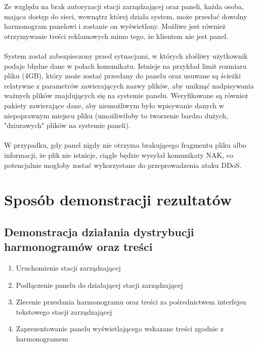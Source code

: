 \documentclass[12pt, a4paper]{article}
\providecommand{\tightlist}{%
  \setlength{\itemsep}{0pt}\setlength{\parskip}{0pt}}
\begin{document}
Ze względu na brak autoryzacji stacji zarządzającej oraz paneli, każda osoba, mająca dostęp do sieci, wewnątrz której działa system, może przesłać dowolny harmonogram panelowi i zostanie on wyświetlony. Możliwe jest również otrzymywanie treści reklamowych mimo tego, że klientem nie jest panel.
\\
\\
System został zabezpieczony przed sytuacjami, w których złośliwy użytkownik podaje błędne dane w polach komunikatu. Istnieje na przykład limit rozmiaru pliku (4GB), który może zostać przesłany do panelu oraz usuwane są ścieżki relatywne z parametrów zawierających nazwy plików, aby uniknąć nadpisywania ważnych plików znajdujących się na systemie panelu. Weryfikowane są również pakiety zawierające dane, aby niemożliwym było wpisywanie danych w niepoprawnym miejscu pliku (umożliwiłoby to tworzenie bardzo dużych, "dziurawych" plików na systemie paneli).
\\
\\
W przypadku, gdy panel nigdy nie otrzyma brakującego fragmentu pliku albo informacji, że plik nie istnieje, ciągle będzie wysyłał komunikaty NAK, co potencjalnie mogłoby zostać wykorzystane do przeprowadzenia ataku DDoS.

\hypertarget{sposuxf3b-demonstracji-rezultatuxf3w}{%
\section{Sposób demonstracji rezultatów}\label{sposuxf3b-demonstracji-rezultatuxf3w}}

\hypertarget{demonstracja-dziaux142ania-dystrybucji-harmonogramuxf3w-oraz-treux15bci}{%
\subsection{Demonstracja działania dystrybucji harmonogramów oraz treści}\label{demonstracja-dziaux142ania-dystrybucji-harmonogramuxf3w-oraz-treux15bci}}

\begin{enumerate}
\def\labelenumi{\arabic{enumi}.}
\tightlist
\item
  Uruchomienie stacji zarządzającej
\item
  Podłączenie panelu do działającej stacji zarządzającej
\item
  Zlecenie przesłania harmonogramu oraz treści za pośrednictwem
  interfejsu tekstowego stacji zarządzającej
\item
  Zaprezentowanie panelu wyświetlającego wskazane treści zgodnie z
  harmonogramem
\end{enumerate}
\end{document}
